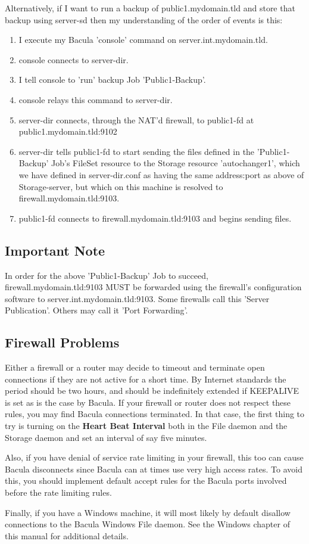 Alternatively, if I want to run a backup of public1.mydomain.tld and store
that backup using server-sd then my understanding of the order of events is
this:

\begin{enumerate}
\item I execute my Bacula 'console' command on server.int.mydomain.tld.
\item console connects to server-dir.
\item I tell console to 'run' backup Job 'Public1-Backup'.
\item console relays this command to server-dir.
\item server-dir connects, through the NAT'd firewall, to public1-fd at
   public1.mydomain.tld:9102
\item server-dir tells public1-fd to start sending the files defined in  the
   'Public1-Backup' Job's FileSet resource to the Storage resource
   'autochanger1', which we have defined in server-dir.conf as having the
   same address:port as above of Storage-server, but which on this machine
   is resolved to firewall.mydomain.tld:9103.
\item public1-fd connects to firewall.mydomain.tld:9103 and begins sending
   files.
   \end{enumerate}

\subsection{Important Note}

In order for the above 'Public1-Backup' Job to succeed,
firewall.mydomain.tld:9103 MUST be forwarded using the firewall's
configuration software to server.int.mydomain.tld:9103. Some firewalls call
this 'Server Publication'. Others may call it 'Port Forwarding'.

\subsection{Firewall Problems}
Either a firewall or a router may decide to timeout and terminate
open connections if they are not active for a short time. By Internet
standards the period should be two hours, and should be indefinitely
extended if KEEPALIVE is set as is the case by Bacula.  If your firewall
or router does not respect these rules, you may find Bacula connections
terminated. In that case, the first thing to try is turning on the
{\bf Heart Beat Interval} both in the File daemon and the Storage daemon
and set an interval of say five minutes.

Also, if you have denial of service rate limiting in your firewall, this
too can cause Bacula disconnects since Bacula can at times use very high
access rates. To avoid this, you should implement default accept
rules for the Bacula ports involved before the rate limiting rules.

Finally, if you have a Windows machine, it will most likely by default
disallow connections to the Bacula Windows File daemon.  See the
Windows chapter of this manual for additional details.
